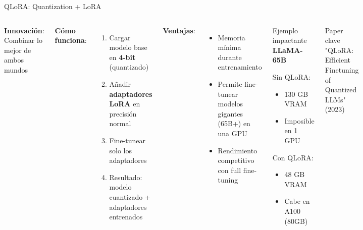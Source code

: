 \begin{frame}{QLoRA: Quantization + LoRA}

\begin{columns}
\textbf{Innovación}: Combinar lo mejor de ambos mundos

\vspace{0.5em}

\textbf{Cómo funciona}:
\begin{enumerate}
    \item Cargar modelo base en \textbf{4-bit} (quantizado)
    \item Añadir \textbf{adaptadores LoRA} en precisión normal
    \item Fine-tunear solo los adaptadores
    \item Resultado: modelo cuantizado + adaptadores entrenados
\end{enumerate}

\vspace{0.5em}

\textbf{Ventajas}:
\begin{itemize}
    \item Memoria mínima durante entrenamiento
    \item Permite fine-tunear modelos gigantes (65B+) en una GPU
    \item Rendimiento competitivo con full fine-tuning
\end{itemize}

\begin{exampleblock}{Ejemplo impactante}
\small
\textbf{LLaMA-65B}

Sin QLoRA:
\begin{itemize}
    \item 130 GB VRAM
    \item Imposible en 1 GPU
\end{itemize}

Con QLoRA:
\begin{itemize}
    \item 48 GB VRAM
    \item Cabe en A100 (80GB)
\end{itemize}
\end{exampleblock}

\vspace{0.5em}

\begin{block}{Paper clave}
\small
"QLoRA: Efficient Finetuning of Quantized LLMs" (2023)
\end{block}

\end{columns}

\end{frame}

